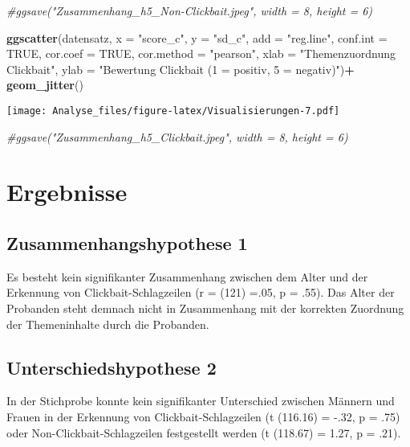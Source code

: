 \documentclass[]{article}
\newenvironment{Shaded}{\begin{snugshade}}{\end{snugshade}}
\newcommand{\KeywordTok}[1]{\textcolor[rgb]{0.13,0.29,0.53}{\textbf{#1}}}
\newcommand{\DataTypeTok}[1]{\textcolor[rgb]{0.13,0.29,0.53}{#1}}
\newcommand{\StringTok}[1]{\textcolor[rgb]{0.31,0.60,0.02}{#1}}
\newcommand{\CommentTok}[1]{\textcolor[rgb]{0.56,0.35,0.01}{\textit{#1}}}
\newcommand{\OtherTok}[1]{\textcolor[rgb]{0.56,0.35,0.01}{#1}}
\newcommand{\OperatorTok}[1]{\textcolor[rgb]{0.81,0.36,0.00}{\textbf{#1}}}
\newcommand{\NormalTok}[1]{#1}
\begin{document}
\begin{Shaded}
\begin{Highlighting}[]
\CommentTok{#ggsave("Zusammenhang_h5_Non-Clickbait.jpeg", width = 8, height = 6)}

\KeywordTok{ggscatter}\NormalTok{(datensatz, }\DataTypeTok{x =} \StringTok{"score_c"}\NormalTok{, }\DataTypeTok{y =} \StringTok{"sd_c"}\NormalTok{, }
          \DataTypeTok{add =} \StringTok{"reg.line"}\NormalTok{, }\DataTypeTok{conf.int =} \OtherTok{TRUE}\NormalTok{, }
          \DataTypeTok{cor.coef =} \OtherTok{TRUE}\NormalTok{, }\DataTypeTok{cor.method =} \StringTok{"pearson"}\NormalTok{,}
          \DataTypeTok{xlab =} \StringTok{"Themenzuordnung Clickbait"}\NormalTok{, }\DataTypeTok{ylab =} \StringTok{"Bewertung Clickbait (1 = positiv, 5 = negativ)"}\NormalTok{)}\OperatorTok{+}
\StringTok{  }\KeywordTok{geom_jitter}\NormalTok{()}
\end{Highlighting}
\end{Shaded}

\texttt{[image: Analyse\_files/figure-latex/Visualisierungen-7.pdf]}

\begin{Shaded}
\begin{Highlighting}[]
\CommentTok{#ggsave("Zusammenhang_h5_Clickbait.jpeg", width = 8, height = 6)}
\end{Highlighting}
\end{Shaded}

\section{Ergebnisse}\label{ergebnisse}

\subsection{Zusammenhangshypothese 1}\label{zusammenhangshypothese-1}

Es besteht kein signifikanter Zusammenhang zwischen dem Alter und der
Erkennung von Clickbait-Schlagzeilen (r = (121) =.05, p = .55). Das
Alter der Probanden steht demnach nicht in Zusammenhang mit der
korrekten Zuordnung der Themeninhalte durch die Probanden.

\subsection{Unterschiedshypothese 2}\label{unterschiedshypothese-2}

In der Stichprobe konnte kein signifikanter Unterschied zwischen Männern
und Frauen in der Erkennung von Clickbait-Schlagzeilen (t (116.16) =
-.32, p = .75) oder Non-Clickbait-Schlagzeilen festgestellt werden (t
(118.67) = 1.27, p = .21).
\end{document}

